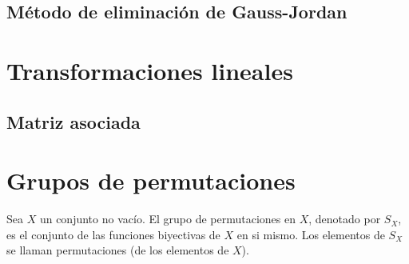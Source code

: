 \documentclass[12pt]{article}
\begin{document}
\subsection{Método de eliminación de Gauss-Jordan}
\begin{description}
	\item
\end{description}

\newpage
\section{Transformaciones lineales}
\begin{description}
	\item
\end{description}

\subsection{Matriz asociada}
\begin{description}
	\item
\end{description}

\newpage
\section{Grupos de permutaciones}

Sea $X$ un conjunto no vacío. El grupo de permutaciones en $X$, denotado por $S_X$, es el conjunto de las funciones biyectivas de $X$ en si mismo. Los elementos de $S_X$ se llaman permutaciones (de los elementos de $X$).
\end{document}

